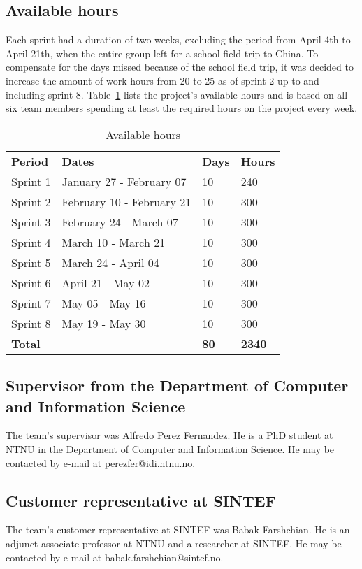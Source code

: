 \subsection{Available hours}
\label{sec:availableHours}
Each sprint had a duration of two weeks, excluding the period from April 4th to April 21th, when the entire group left for a school field trip to China. To compensate for the days missed because of the school field trip, it was decided to increase the amount of work hours from 20 to 25 as of sprint 2 up to and including sprint 8. Table~\ref{tab:availHours} lists the project's available hours and is based on all six team members spending at least the required hours on the project every week.

\begin{table}[H]
\centering
{}
\begin{tabular}{|l|l|l|l|}
\hline
\textbf{Period} & \textbf{Dates} & \textbf{Days} & \textbf{Hours}\\
Sprint 1& January 27 - February 07 & 10  & 240 \\
Sprint 2 & February 10 - February 21 &10  & 300 \\
Sprint 3 & February 24 - March 07 &10 & 300 \\
Sprint 4 & March 10 - March 21 &10  &300 \\
Sprint 5 & March 24 - April 04 &10&  300 \\
Sprint 6 & April 21 - May 02 &10  &300 \\
Sprint 7 & May 05 - May 16 &10  &300 \\
Sprint 8 & May 19 - May 30 &10  &300 \\
\textbf{Total}&& \textbf{80}&  \textbf{2340}\\\hline
\end{tabular}
\caption{Available hours}
\label{tab:availHours}
\end{table}


\subsection{Supervisor from the Department of Computer and Information Science}
The team's supervisor was Alfredo Perez Fernandez. He is a PhD student at NTNU in the Department of Computer and Information Science. He may be contacted by e-mail at perezfer@idi.ntnu.no.

\subsection{Customer representative at SINTEF}
The team's customer representative at SINTEF was Babak Farshchian. He is an adjunct associate professor at NTNU and a researcher at SINTEF. He may be contacted by e-mail at babak.farshchian@sintef.no.
